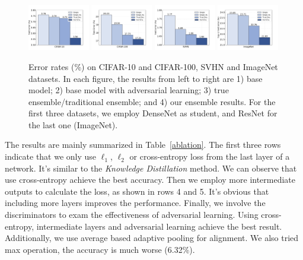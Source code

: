 \documentclass[letterpaper]{article} %
\begin{document}
\begin{figure}[t]
	\centering
	\includegraphics[width=0.24\textwidth]{figs/cifar10}
	\includegraphics[width=0.24\textwidth]{figs/cifar100}
	\includegraphics[width=0.24\textwidth]{figs/SVHN}
	\includegraphics[width=0.24\textwidth]{figs/imagenet}
	\vspace{-0.10in}
	\caption{Error rates (\%) on CIFAR-10 and CIFAR-100, SVHN and ImageNet datasets. In each figure, the results from left to right are 1) base model; 2) base model with adversarial learning; 3) true ensemble/traditional ensemble; and 4) our ensemble results. For the first three datasets, we employ DenseNet as student, and ResNet for the last one (ImageNet).}
	\label{com_all}
\end{figure}

The results are mainly summarized in Table~\ref{ablation}. The first three rows indicate that we only use $\ell_1$, $\ell_2$ or cross-entropy loss from the last layer of a network. It's similar to the {\em {Knowledge Distillation}} method. We can observe that use cross-entropy achieve the best accuracy. Then we employ more intermediate outputs to calculate the loss, as shown in rows 4 and 5. It's obvious that including more layers improves the performance. Finally, we involve the discriminators to exam the effectiveness of adversarial learning. Using cross-entropy, intermediate layers and adversarial learning achieve the best result. Additionally, we use average based adaptive pooling for alignment. We also tried max operation, the accuracy is much worse (6.32\%).
\end{document}
